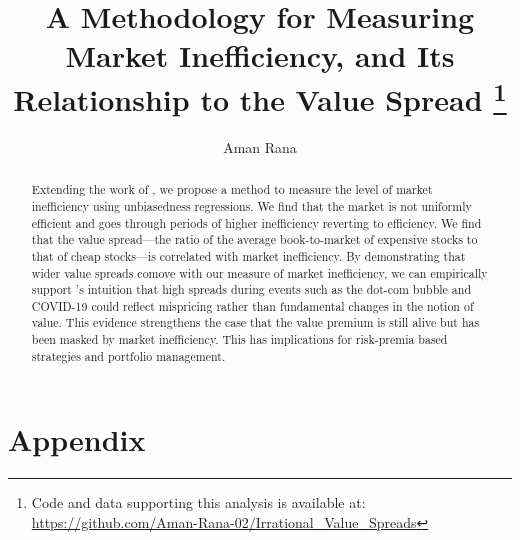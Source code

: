 \documentclass[11pt,a4paper,english]{article}
\date{\displaydate{date}}
\title{A Methodology for Measuring Market Inefficiency, and Its Relationship to the Value Spread 
\thanks{Code and data supporting this analysis is available at: \url{https://github.com/Aman-Rana-02/Irrational_Value_Spreads}}}
\author{%
  Aman Rana\\
}
\begin{document}
  \maketitle

  \begin{abstract}
    \noindent Extending the work of \citet{boguth_2023}, we propose a method to measure the level of market inefficiency using unbiasedness regressions.
    We find that the market is not uniformly efficient and goes through periods of higher inefficiency reverting to efficiency. We find that the value spread—the ratio of the average book-to-market of expensive stocks to that of cheap stocks—is correlated with market inefficiency. 
    By demonstrating that wider value spreads comove with our measure of market inefficiency, we can empirically support \citet{asness_2024}'s intuition 
    that high spreads during events such as the dot-com bubble and COVID-19 could reflect mispricing rather than fundamental changes in the notion of value. 
    This evidence strengthens the case that the value premium is still alive but has been masked by market inefficiency. 
    This has implications for risk-premia based strategies and portfolio management.
  \end{abstract}

  \newpage
  \tableofcontents

  \newpage
  

  

  
  
  

  

  \newpage
  
  

  \section*{Appendix}
  \renewcommand{\thesection}{\Alph{section}}
  \setcounter{section}{0}
  
\end{document}
